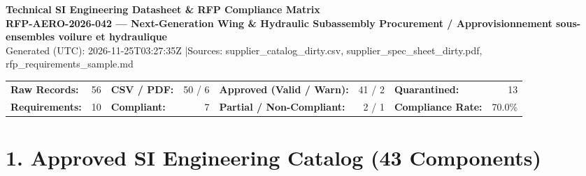 \documentclass[10pt,a4paper,landscape]{article}
\begin{document}
\begin{center}
  {\LARGE\bfseries\textcolor{navyblue}{Technical SI Engineering Datasheet \& RFP Compliance Matrix}}\\[0.35em]
  {\large\bfseries RFP-AERO-2026-042 --- Next-Generation Wing \& Hydraulic Subassembly Procurement / Approvisionnement sous-ensembles voilure et hydraulique}\\[0.3em]
  {\small\textcolor{slatetext}{Generated (UTC): 2026-11-25T03:27:35Z \quad|\quad Sources: supplier\_catalog\_dirty.csv, supplier\_spec\_sheet\_dirty.pdf, rfp\_requirements\_sample.md}}
\end{center}

\vspace{0.4em}

\begin{center}
\begin{tabular}{@{}lrlrlrlr@{}}
\toprule
\textbf{Raw Records:} & 56 &
\textbf{CSV / PDF:} & 50 / 6 &
\textbf{Approved (Valid / Warn):} & 41 / 2 &
\textbf{Quarantined:} & 13 \\
\textbf{Requirements:} & 10 &
\textbf{Compliant:} & 7 &
\textbf{Partial / Non-Compliant:} & 2 / 1 &
\textbf{Compliance Rate:} & 70.0\% \\
\bottomrule
\end{tabular}
\end{center}

\section*{1. Approved SI Engineering Catalog (43 Components)}
\end{document}
